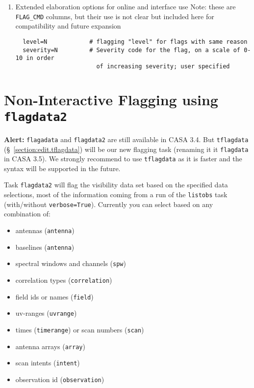 \begin{enumerate}
\item Extended elaboration options for online and interface use Note:
these are {\tt FLAG\_CMD} columns, but their use is not clear but included
here for compatibility and future expansion

\small
\begin{verbatim}
  level=N            # flagging "level" for flags with same reason
  severity=N         # Severity code for the flag, on a scale of 0-10 in order 
                       of increasing severity; user specified
\end{verbatim}
\normalsize

\end{enumerate}

\section{Non-Interactive Flagging using {\tt flagdata2}}
\label{section:edit.flagdata}

{\bf Alert:} {\tt flagadata} and {\tt flagdata2} are still available
in CASA 3.4. But {\tt tflagdata} (\S~\ref{section:edit.tflagdata})
will be our new flagging task (renaming it it {\tt flagdata} in CASA
3.5). We strongly recommend to use {\tt tflagdata} as it is faster and
the syntax will be supported in the future.



Task {\tt flagdata2} will flag the visibility data set based on the
specified data selections, most of the information coming from a run
of the {\tt listobs} task (with/without {\tt verbose=True}). Currently you can
select based on any combination of: 

\begin{itemize}
   \item antennas ({\tt antenna})
   \item baselines ({\tt antenna})
   \item spectral windows and channels ({\tt spw})
   \item correlation types ({\tt correlation})
   \item field ids or names ({\tt field})
   \item uv-ranges ({\tt uvrange})
   \item times ({\tt timerange}) or scan numbers ({\tt scan})
   \item antenna arrays ({\tt array})
   \item scan intents ({\tt intent})
   \item observation id ({\tt observation})
\end{itemize}

